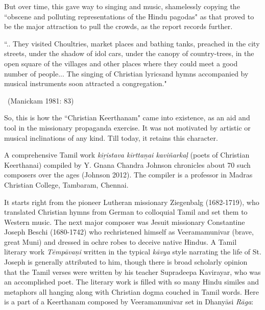 But over time, this gave way to singing and music, shamelessly copying the ``obscene and polluting representations of the Hindu pagodas" as that proved to be the major attraction to pull the crowds, as the report records further.

\begin{myquote}
``.. They visited Choultries, market places and bathing tanks, preached in the city streets, under the shadow of idol cars, under the canopy of country-trees, in the open square of the villages and other places where they could meet a good number of people... The singing of Christian lyricsand hymns accompanied by musical instruments soon attracted a congregation." 

~\hfill (Manickam 1981: 83)
\end{myquote}

So, this is how the ``Christian Keerthanam" came into existence, as an aid and tool in the missionary propaganda exercise. It was not motivated by artistic or musical inclinations of any kind. Till today, it retains this character.

A comprehensive Tamil work \textit{kiṟistava kīrttaṉai kaviñarkaḷ} (poets of Christian Keerthanai) compiled by Y. Gnana Chandra Johnson chronicles about 70 such composers over the ages (Johnson 2012). The compiler is a professor in Madras Christian College, Tambaram, Chennai.

It starts right from the pioneer Lutheran missionary Ziegenbalg (1682-1719), who translated Christian hymns from German to colloquial Tamil and set them to Western music. The next major composer was Jesuit missionary Constantine Joseph Beschi (1680-1742) who rechristened himself as Veeramamunivar (brave, great Muni) and dressed in ochre robes to deceive native Hindus. A Tamil literary work \textit{Tēmpāvaṇi }written in the typical \textit{kāvya} style narrating the life of St. Joseph is generally attributed to him, though there is broad scholarly opinion that the Tamil verses were written by his teacher Supradeepa Kavirayar, who was an accomplished poet. The literary work is filled with so many Hindu similes and metaphors all hanging along with Christian dogma couched in Tamil words. Here is a part of a Keerthanam composed by Veeramamunivar set in Dhanyāsi \textit{Rāga}:

